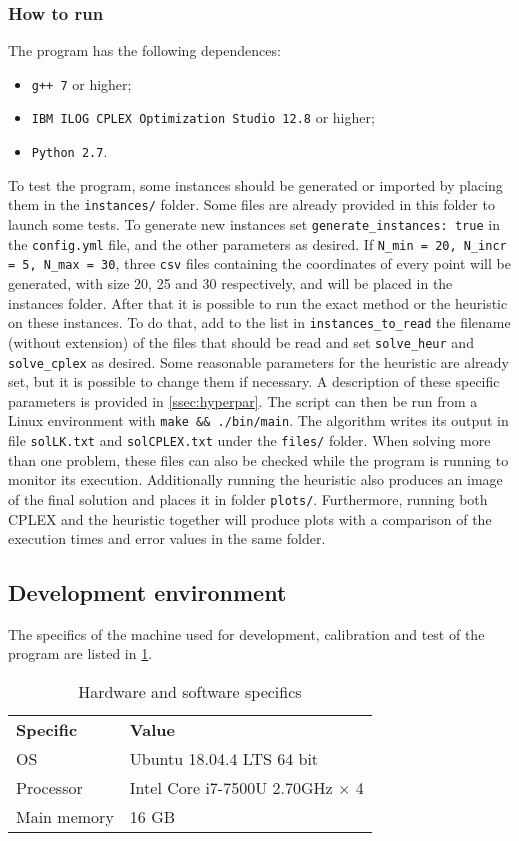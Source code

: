 \subsubsection{How to run}
The program has the following dependences:
\begin{itemize}
	\setlength\itemsep{0.03em}
	\item \texttt{g++ 7} or higher;
	\item \texttt{IBM ILOG CPLEX Optimization Studio 12.8} or higher;
	\item \texttt{Python 2.7}.
\end{itemize}

To test the program, some instances should be generated or imported by placing them in the \texttt{instances/} folder. Some files are already provided in this folder to launch some tests. To generate new instances set \texttt{generate\_instances: true} in the \texttt{config.yml} file, and the other parameters as desired. If \texttt{N\_min = 20, N\_incr = 5, N\_max = 30}, three \texttt{csv} files containing the coordinates of every point will be generated, with size 20, 25 and 30 respectively, and will be placed in the instances folder. After that it is possible to run the exact method or the heuristic on these instances. To do that, add to the list in \texttt{instances\_to\_read} the filename (without extension) of the files that should be read and set \texttt{solve\_heur} and \texttt{solve\_cplex} as desired. Some reasonable parameters for the heuristic are already set, but it is possible to change them if necessary. A description of these specific parameters is provided in \cref{ssec:hyperpar}.
The script can then be run from a Linux environment with \texttt{make \&\& ./bin/main}. The algorithm writes its output in file \texttt{solLK.txt} and \texttt{solCPLEX.txt} under the \texttt{files/} folder. When solving more than one problem, these files can also be checked while the program is running to monitor its execution. Additionally running the heuristic also produces an image of the final solution and places it in folder \texttt{plots/}. Furthermore, running both CPLEX and the heuristic together will produce plots with a comparison of the execution times and error values in the same folder. \\

\subsection{Development environment}
The specifics of the machine used for development, calibration and test of the program are listed in \cref{tab:maspecs}.
\begin{table}[H]
	\caption{Hardware and software specifics}
	\label{tab:maspecs}
	\centering
	\begin{tabular}[t]{ll}
		\rowcolor[HTML]{EFEFEF}
		\textbf{Specific} & \textbf{Value} \\
		OS       & Ubuntu 18.04.4 LTS 64 bit	   \\
		Processor & Intel Core i7-7500U 2.70GHz $\times$ 4     \\
		Main memory  & 16 GB  
	\end{tabular}
\end{table}


